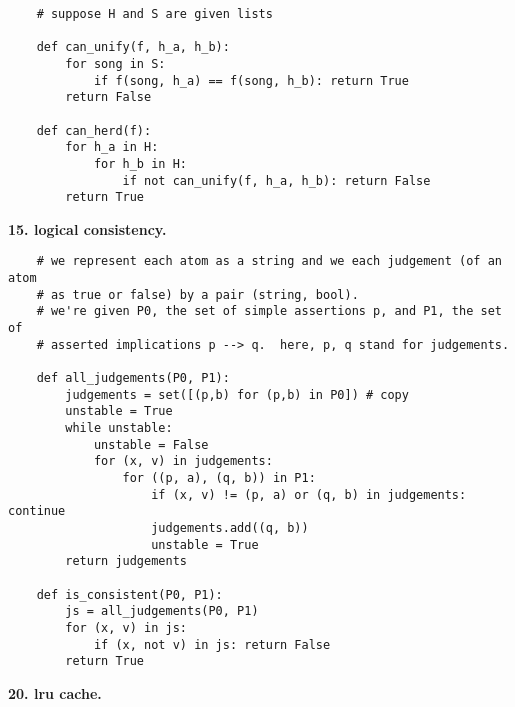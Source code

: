 \documentclass{article}
\begin{document}
\begin{verbatim}
    # suppose H and S are given lists

    def can_unify(f, h_a, h_b):
        for song in S:
            if f(song, h_a) == f(song, h_b): return True
        return False

    def can_herd(f): 
        for h_a in H:
            for h_b in H:
                if not can_unify(f, h_a, h_b): return False
        return True
\end{verbatim}

\newpage
    \par\noindent\hspace{-1cm}
    \textbf{15. logical consistency.}

\begin{verbatim}
    # we represent each atom as a string and we each judgement (of an atom
    # as true or false) by a pair (string, bool).
    # we're given P0, the set of simple assertions p, and P1, the set of
    # asserted implications p --> q.  here, p, q stand for judgements.

    def all_judgements(P0, P1): 
        judgements = set([(p,b) for (p,b) in P0]) # copy
        unstable = True
        while unstable:
            unstable = False
            for (x, v) in judgements:
                for ((p, a), (q, b)) in P1:
                    if (x, v) != (p, a) or (q, b) in judgements: continue
                    judgements.add((q, b))
                    unstable = True
        return judgements

    def is_consistent(P0, P1):
        js = all_judgements(P0, P1)
        for (x, v) in js:
            if (x, not v) in js: return False
        return True
\end{verbatim}

\newpage
    \par\noindent\hspace{-1cm}
    \textbf{20. lru cache.}
\end{document}
